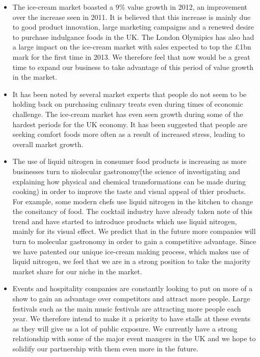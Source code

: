 \documentclass{article}
\begin{document}
  \begin{itemize}
  \item The ice-cream market boasted a 9\% value growth in 2012, an improvement over the increase seen in 2011. It is believed that this increase is mainly due to good product innovation, large marketing campaigns and a renewed desire to purchase indulgance foods in the UK. The London Olymipics has also had a large impact on the ice-cream market with sales expected to top the £1bn mark for the first time in 2013. We therefore feel that now would be a great time to expand our business to take advantage of this period of value growth in the market.

  \item It has been noted by several market experts that people do not seem to be holding back on purchasing culinary treats even during times of economic challenge. The ice-cream market has even seen growth during some of the hardest periods for the UK economy. It has been suggested that people are seeking comfort foods more often as a result of increased stress, leading to overall market growth.

  \item The use of liquid nitrogen in consumer food products is increasing as more businesses turn to \"molecular gastronomy\" (the science of investigating and explaining how physical and chemical transformations can be made during cooking) in order to improve the taste and visual appeal of thier products. For example, some modern chefs use liquid nitrogen in the kitchen to change the consitancy of food. The cocktail industry have already taken note of this trend and have started to introduce products which use liquid nitrogen, mainly for its visual effect. We predict that in the future more companies will turn to molecular gastronomy in order to gain a competitive advantage. Since we have patented our unique ice-cream making process, which makes use of liquid nitrogen, we feel that we are in a strong position to take the majority market share for our niche in the market. 

  \item Events and hospitality companies are constantly looking to put on more of a show to gain an advantage over competitors and attract more people. Large festivals such as the main music festivals are attracting more people each year. We therefore intend to make it a priority to have stalls at these events as they will give us a lot of public exposure. We currently have a strong relationship with some of the major event mangers in the UK and we hope to solidify our partnership with them even more in the future.


\end{itemize}
\end{document}
